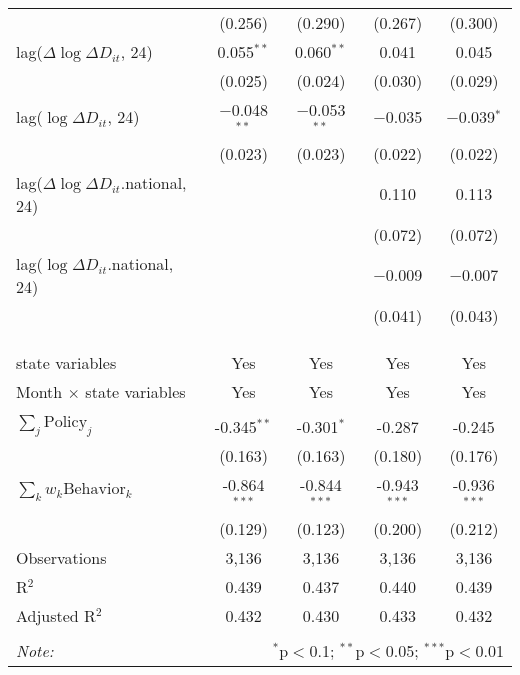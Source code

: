 \begin{tabular}{@{\extracolsep{1pt}}lcccc}
  & (0.256) & (0.290) & (0.267) & (0.300) \\ 
  lag($\Delta \log \Delta D_{it}$, 24) & 0.055$^{**}$ & 0.060$^{**}$ & 0.041 & 0.045 \\ 
  & (0.025) & (0.024) & (0.030) & (0.029) \\ 
  lag($\log \Delta D_{it}$, 24) & $-$0.048$^{**}$ & $-$0.053$^{**}$ & $-$0.035 & $-$0.039$^{*}$ \\ 
  & (0.023) & (0.023) & (0.022) & (0.022) \\ 
  lag($\Delta \log \Delta D_{it}$.national, 24) &  &  & 0.110 & 0.113 \\ 
  &  &  & (0.072) & (0.072) \\ 
  lag($\log \Delta D_{it}$.national, 24) &  &  & $-$0.009 & $-$0.007 \\ 
  &  &  & (0.041) & (0.043) \\ 
   &  &  &  &  \\ 
  &  &  &  &  \\ 
 \hline \\[-1.8ex] 
state variables & Yes & Yes & Yes & Yes \\ 
Month $\times$ state variables & Yes & Yes & Yes & Yes \\ 
\hline \\[-1.8ex] 
$\sum_j \mathrm{Policy}_j$ & -0.345$^{**}$ & -0.301$^{*}$ & -0.287 & -0.245 \\ 
 & (0.163) & (0.163) & (0.180) & (0.176) \\ 
$\sum_k w_k \mathrm{Behavior}_k$ & -0.864$^{***}$ & -0.844$^{***}$ & -0.943$^{***}$ & -0.936$^{***}$ \\ 
 & (0.129) & (0.123) & (0.200) & (0.212) \\ 
Observations & 3,136 & 3,136 & 3,136 & 3,136 \\ 
R$^{2}$ & 0.439 & 0.437 & 0.440 & 0.439 \\ 
Adjusted R$^{2}$ & 0.432 & 0.430 & 0.433 & 0.432 \\ 
\hline 
\hline \\[-1.8ex] 
\textit{Note:}  & \multicolumn{4}{r}{$^{*}$p$<$0.1; $^{**}$p$<$0.05; $^{***}$p$<$0.01} \\ 
\end{tabular} 